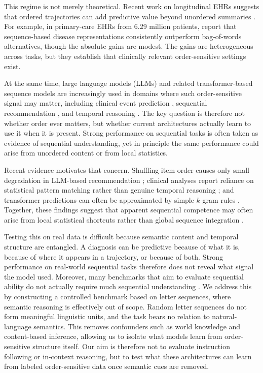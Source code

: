 \documentclass{article}
\theoremstyle{plain}
\theoremstyle{definition}
\theoremstyle{remark}
\begin{document}
This regime is not merely theoretical. Recent work on longitudinal EHRs suggests that ordered trajectories can add predictive value beyond unordered summaries \citep{edelman2026order_specific_ehr,beaney2024coded_disease_representations,placido2023pancreatic_trajectories,pollington2026trajectory_review}. For example, in primary-care EHRs from 6.29 million patients, \citet{beaney2024coded_disease_representations} report that sequence-based disease representations consistently outperform bag-of-words alternatives, though the absolute gains are modest. The gains are heterogeneous across tasks, but they establish that clinically relevant order-sensitive settings exist.

At the same time, large language models (LLMs) and related transformer-based sequence models are increasingly used in domains where such order-sensitive signal may matter, including clinical event prediction \citep{savcisens2024using,delphi2025transformer,li2020behrt,rasmy2021medbert}, sequential recommendation \citep{kimLostSequenceLarge2025b}, and temporal reasoning \citep{fatemiTESTTIMEBENCHMARK2025}. The key question is therefore not whether order ever matters, but whether current architectures actually learn to use it when it is present. Strong performance on sequential tasks is often taken as evidence of sequential understanding, yet in principle the same performance could arise from unordered content or from local statistics.

Recent evidence motivates that concern. Shuffling item order causes only small degradation in LLM-based recommendation \citep{kimLostSequenceLarge2025b}; clinical analyses report reliance on statistical pattern matching rather than genuine temporal reasoning \citep{bediFidelityMedicalReasoning2025}; and transformer predictions can often be approximated by simple $k$-gram rules \citep{nguyen2024understanding}. Together, these findings suggest that apparent sequential competence may often arise from local statistical shortcuts rather than global sequence integration \citep{mccoy2019right,geirhos2020shortcut,mirzadeh2024gsm}.

Testing this on real data is difficult because semantic content and temporal structure are entangled. A diagnosis can be predictive because of what it is, because of where it appears in a trajectory, or because of both. Strong performance on real-world sequential tasks therefore does not reveal what signal the model used. Moreover, many benchmarks that aim to evaluate sequential ability do not actually require much sequential understanding \citep{klenitskiyDoesItLook2024}. We address this by constructing a controlled benchmark based on letter sequences, where semantic reasoning is effectively out of scope. Random letter sequences do not form meaningful linguistic units, and the task bears no relation to natural-language semantics. This removes confounders such as world knowledge and content-based inference, allowing us to isolate what models learn from order-sensitive structure itself. Our aim is therefore not to evaluate instruction following or in-context reasoning, but to test what these architectures can learn from labeled order-sensitive data once semantic cues are removed.
\end{document}
